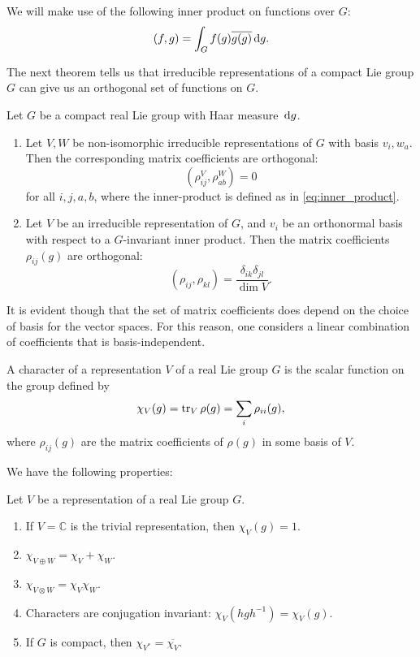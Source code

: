 \documentclass{report}
\begin{document}
We will make use of the following inner product on functions over $G$:
\begin{equation}\label{eq:inner_product}
    (f, g) = \int_G f(g) \overline{g(g)} \,\mathrm{d} g.
\end{equation}

The next theorem tells us that irreducible representations of a compact Lie group $G$ can give us an orthogonal set of functions on $G$.
\begin{theorem}
    Let $G$ be a compact real Lie group with Haar measure $\,\mathrm{d} g$.
    \begin{enumerate}[label = (\roman*)]
        \item Let $V, W$ be non-isomorphic irreducible representations of $G$ with basis $v_i, w_a$.
        Then the corresponding matrix coefficients are orthogonal:
        \[
        \left( \rho^V_{ij}, \rho^W_{ab} \right) = 0
        \]
        for all $i,j,a,b$, where the inner-product is defined as in \cref{eq:inner_product}.
        \item Let $V$ be an irreducible representation of $G$, and $v_i$ be an orthonormal basis with respect to a $G$-invariant inner product.
        Then the matrix coefficients $\rho_{ij}(g)$ are orthogonal:
        \[
        \left(\rho_{ij}, \rho_{kl} \right) = \frac{ \delta_{ik} \delta_{jl} }{\dim V}.
        \]
    \end{enumerate}
\end{theorem}

It is evident though that the set of matrix coefficients does depend on the choice of basis for the vector spaces.
For this reason, one considers a linear combination of coefficients that is basis-independent.

\begin{definition}
    A character of a representation $V$ of a real Lie group $G$ is the scalar function on the group defined by
    \[
    \chi_V(g) = \operatorname{tr}_V \rho(g) = \sum_i \rho_{ii}(g),
    \]
    where $\rho_{ij}(g)$ are the matrix coefficients of $\rho(g)$ in some basis of $V$.
\end{definition}
We have the following properties:
\begin{proposition}
    Let $V$ be a representation of a real Lie group $G$.
    \begin{enumerate}[label = (\roman*)]
        \item If $V = \mathbb C$ is the trivial representation, then $\chi_V(g) = 1$.
        \item $\chi_{V \oplus W} = \chi_V + \chi_W$.
        \item $\chi_{V \otimes W} = \chi_V \chi_W$.
        \item Characters are conjugation invariant: $\chi_V(hgh^{-1}) = \chi_V(g)$.
        \item If $G$ is compact, then $\chi_{V^*} = \overline{\chi_V}$.
    \end{enumerate}
\end{proposition}
\end{document}
